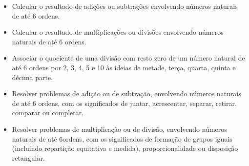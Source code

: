 
\begin{itemize}
\item Calcular o resultado de adições ou subtrações envolvendo números
naturais de até 6 ordens.

\item Calcular o resultado de multiplicações ou divisões envolvendo números
naturais de até 6 ordens.

\item Associar o quociente de uma divisão com resto zero de um número
natural de até 6 ordens por 2, 3, 4, 5 e 10 às ideias de metade, terça,
quarta, quinta e décima parte.

\item Resolver problemas de adição ou de subtração, envolvendo números
naturais de até 6 ordens, com os significados de juntar, acrescentar,
separar, retirar, comparar ou completar.

\item Resolver problemas de multiplicação ou de divisão, envolvendo números
naturais de até 6ordens, com os significados de formação de grupos
iguais (incluindo repartição equitativa e medida), proporcionalidade ou
disposição retangular.
\end{itemize}

